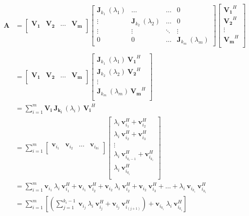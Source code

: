 \begin{align*}
\bm{A}&=
\begin{bmatrix}
\bm{V_1} & \bm{V_2} & \dots & \bm{V_m} \\ 
\end{bmatrix}
\begin{bmatrix}
\bm{J}_{k_1}\:(\lambda_1) & \dots & \dots & 0 \\
\vdots & \bm{J}_{k_2}\:(\lambda_2) & \dots & 0 \\
\vdots & \vdots & \ddots & \vdots \\
0 & 0 & \dots & \bm{J}_{k_m}\:(\lambda_m) 
\end{bmatrix}
\begin{bmatrix}
\bm{V_1}^H \\
\bm{V_2}^H \\
\vdots \\
\bm{V_m}^H \\
\end{bmatrix} \\
\\
&=
\begin{bmatrix}
\bm{V_1} & \bm{V_2} & \dots & \bm{V_m} \\ 
\end{bmatrix}
\begin{bmatrix}
\bm{J}_{k_1}\:(\lambda_1)\:\bm{V_1}^H \\
\bm{J}_{k_2}\:(\lambda_2)\:\bm{V_2}^H \\
\vdots \\
\bm{J}_{k_m}\:(\lambda_m)\:\bm{V_m}^H \\
\end{bmatrix}
\\
&= \sum_{i=1}^m \bm{V_i}\: \bm{J_{k_i}}\: (\lambda_i)\: \bm{V_i}^H \\
	&= \sum_{i=1}^m
	\begin{bmatrix}
	\bm{v}_{i_1} & \bm{v}_{i_2} & \dots & \bm{v}_{i_{ki}} \\ 
	\end{bmatrix}
	\begin{bmatrix}
	\lambda_i\:\bm{v}_{i_1}^H + \bm{v}_{i_2}^H \\
	\lambda_i\:\bm{v}_{i_2}^H  + \bm{v}_{i_3}^H  \\
	\vdots \\
	\lambda_i\:\bm{v}_{i_{k_i - 1}}^H  + \bm{v}_{i_{k_i}}^H \\
	\lambda_i\:\bm{v}_{i_{k_i}}^H \\
	\end{bmatrix} \\
	&= \sum_{i=1}^m \bm{v}_{i_1}\:\lambda_i\:\bm{v}_{i_1}^H  + \bm{v}_{i_1}\:\bm{v}_{i_2}^H + \bm{v}_{i_2}\:\lambda_i\:\bm{v}_{i_2}^H  + \bm{v}_{i_2}\:\bm{v}_{i_3}^H + \dots + \lambda_i\:\bm{v}_{i_{k_i}}\:\bm{v}_{i_{k_i}}^H \\
	&= \sum_{i=1}^m \left[\left(\sum_{j=1}^{k_i - 1}\: \bm{v}_{i_j}\:\lambda_i\:\bm{v}_{i_j}^H +  \bm{v}_{i_j}\:\bm{v}_{i_{(j+1)}}^H\right) +  \bm{v}_{i_{k_i}}\:\lambda_i\:\bm{v}_{i_{k_i}}^H \right]
\end{align*}
